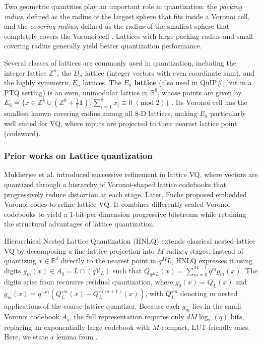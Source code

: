 \documentclass{article}
\theoremstyle{definition}
\theoremstyle{remark}
\begin{document}
Two geometric quantities play an important role in quantization: the \emph{packing radius}, defined as the radius of the largest sphere that fits inside a Voronoi cell, and the \emph{covering radius}, defined as the radius of the smallest sphere that completely covers the Voronoi cell \cite{conway2013sphere}. Lattices with large packing radius and small covering radius generally yield better quantization performance.

Several classes of lattices are commonly used in quantization, including the integer lattice $\mathbb{Z}^n$, the $D_n$ lattice (integer vectors with even coordinate sum), and the highly symmetric $E_n$ lattices. The \textbf{$E_8$ lattice} (also used in QuIP\#, but in a PTQ setting) is an even, unimodular lattice in $\mathbb{R}^8$, whose points are given by 
$E_8 = \bigl\{ x \in \mathbb{Z}^8 \cup (\mathbb{Z}^8 + \tfrac{1}{2}\mathbf{1}) :
\sum_{i=1}^8 x_i \equiv 0 \; (\mathrm{mod}\;2) \bigr\}$ \cite{conway2013sphere}.
Its Voronoi cell has the smallest known covering radius among all 8-D lattices, making $E_8$ particularly well suited for VQ, where inputs are projected to their nearest lattice point (codeword).


\subsubsection{Prior works on Lattice quantization}
Mukherjee et al. \cite{mukherjee2002successive} introduced successive refinement in lattice VQ, where vectors are quantized through a hierarchy of Voronoi-shaped lattice codebooks that progressively reduce distortion at each stage. Later, Fuchs \cite{fuchs2013embedded} proposed embedded Voronoi codes to refine lattice VQ. It combines differently scaled Voronoi codebooks to yield a 1-bit-per-dimension progressive bitstream while retaining the structural advantages of lattice quantization.

Hierarchical Nested Lattice Quantization (HNLQ) \cite{hnlq} extends classical nested-lattice VQ by decomposing a fine-lattice projection into $M$ radix-$q$ stages. Instead of quantizing $x \in \mathbb{R}^d$ directly to the nearest point in $q^M L$, HNLQ expresses it using digits $g_m(x) \in A_q = L \cap (q\mathcal{V}_L)$ such that $Q_{q^M L}(x) = \sum_{m=0}^{M-1} q^m g_m(x)$. The digits arise from recursive residual quantization, where $g_0(x)=Q_L(x)$ and $g_m(x)=q^{-m}\!\left(Q_L^{\circ m}(x)-Q_L^{\circ (m+1)}(x)\right)$, with $Q_L^{\circ m}$ denoting $m$ nested applications of the coarse-lattice quantizer. Because each $g_m$ lies in the small Voronoi codebook $A_q$, the full representation requires only $dM\log_2(q)$ bits, replacing an exponentially large codebook with $M$ compact, LUT-friendly ones. Here, we state a lemma from \cite{hnlq}.
\end{document}
